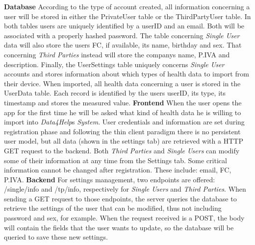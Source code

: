 \documentclass[titlepage]{article}
\begin{document}
	{\bf Database} \newline
	According to the type of account created, all information concerning a user will be stored in either the PrivateUser table or the ThirdPartyUser table. In both tables users are uniquely identified by a userID and an email. Both will be associated with a properly hashed password. The table concerning {\it Single User} data will also store the user\textsc{}s FC, if available, its name, birthday and sex. That concerning {\it Third Parties} instead will store the company\textsc{}s name, P.IVA and description. 
	Finally, the UserSettings table uniquely concerns {\it Single User} accounts and stores information about which types of health data to import from their device. When imported, all health data concerning a user is stored in the UserData table. Each record is identified by the user\textsc{}s userID, its type, its timestamp and stores the measured value.
	\newline
	\newline
	\noindent
	{\bf Frontend} \newline
	When the user opens the app for the first time he will be asked what kind of health data he is willing to import into {\it Data4Help}\textsc{}s {\it System}. User credentials and information are set during registration phase and following the thin client paradigm there is no persistent user model, but all data (shown in the settings tab) are retrieved with a HTTP GET request to the backend. Both {\it Third Parties} and {\it Single Users} can modify some of their information at any time from the Settings tab. Some critical information cannot be changed after registration. These include: email, FC, P.IVA. 
	\newline
	\newline
	\noindent
	{\bf Backend} \newline
	For settings management, two endpoints are offered: /single/info and /tp/info, respectively for {\it Single Users} and {\it Third Parties}. When sending a GET request to those endpoints, the server queries the database to retrieve the settings of the user that can be modified, thus not including password and sex, for example. When the request received is a POST, the body will contain the fields that the user wants to update, so the database will be queried to save these new settings.
	
	
\end{document}
